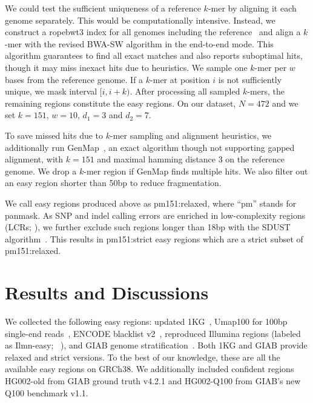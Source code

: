 \documentclass[webpdf,contemporary,large,namedate]{oup-authoring-template}%
\begin{document}
We could test the sufficient uniqueness of a reference $k$-mer by aligning it each genome separately.
This would be computationally intensive.
Instead, we construct a ropebwt3 index for all genomes including the reference~\citep{Li:2024ac}
and align a $k$-mer with the revised BWA-SW algorithm in the end-to-end mode.
This algorithm guarantees to find all exact matches and also reports suboptimal hits,
though it may miss inexact hits due to heuristics.
We sample one $k$-mer per $w$ bases from the reference genome.
If a $k$-mer at position $i$ is not sufficiently unique, we mask interval $[i,i+k)$.
After processing all sampled $k$-mers, the remaining regions constitute the easy regions.
On our dataset, $N=472$ and we set $k=151$, $w=10$, $d_1=3$ and $d_2=7$.

To save missed hits due to $k$-mer sampling and alignment heuristics,
we additionally run GenMap~\citep{Pockrandt:2020aa}, an exact algorithm though not supporting gapped alignment, with $k=151$ and maximal hamming distance 3 on the reference genome.
We drop a $k$-mer region if GenMap finds multiple hits.
We also filter out an easy region shorter than 50bp to reduce fragmentation.

We call easy regions produced above as {\sf pm151:relaxed}, where ``pm'' stands for panmask.
As SNP and indel calling errors are enriched in low-complexity regions (LCRs; \citealp{Li:2014aa}),
we further exclude such regions longer than 18bp with the SDUST algorithm~\citep{Morgulis:2006aa}.
This results in {\sf pm151:strict} easy regions which are a strict subset of {\sf pm151:relaxed}.

\section{Results and Discussions}

We collected the following easy regions:
updated {\sf 1KG}~\citep{1000-Genomes-Project-Consortium:2010qc},
{\sf Umap100} for 100bp single-end reads~\citep{Karimzadeh:2018aa},
{\sf ENCODE} blacklist v2~\citep{Amemiya:2019aa},
reproduced Illumina regions (labeled as {\sf Ilmn-easy}; ~\citealp{Aganezov:2022aa}),
and {\sf GIAB} genome stratification~\citep{Dwarshuis:2024aa}.
Both {\sf 1KG} and {\sf GIAB} provide relaxed and strict versions.
To the best of our knowledge, these are all the available easy regions on GRCh38.
We additionally included confident regions {\sf HG002-old} from GIAB ground truth v4.2.1
and {\sf HG002-Q100} from GIAB's new Q100 benchmark v1.1.
\end{document}
